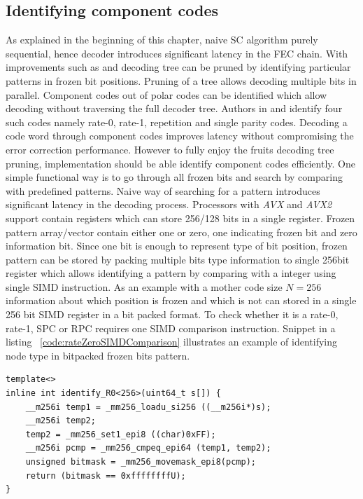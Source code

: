 \subsection{Identifying component codes}
As explained in the beginning of this chapter, naive SC algorithm purely sequential, hence decoder introduces significant latency in the FEC chain. With improvements such as \cite{fastSSC} and \cite{SSC} decoding tree can be pruned by identifying particular patterns in frozen bit positions. Pruning of a tree allows decoding multiple bits in parallel. Component codes out of polar codes can be identified which allow decoding without traversing the full decoder tree. Authors in \cite{SSC} and \cite{fastSSC} identify four such codes namely rate-0, rate-1, repetition and single parity codes. Decoding a code word through component codes improves latency without compromising the error correction performance. However to fully enjoy the fruits decoding tree pruning, implementation should be able identify component codes efficiently. One simple functional way is to go through all frozen bits and search by comparing with predefined patterns. Naive way of searching for a pattern introduces significant latency in the decoding process. Processors with \textit{AVX} and \textit{AVX2} support contain registers which can store 256/128 bits in a single register. Frozen pattern array/vector contain either one or zero, one indicating frozen bit and zero information bit. Since one bit is enough to represent type of bit position, frozen pattern can be stored by packing multiple bits type information to single 256bit register which allows identifying a pattern by comparing with a integer using single SIMD instruction. As an example with a mother code size $N=256$ information about which position is frozen and which is not can stored in a single 256 bit SIMD register in a bit packed format. To check whether it is a rate-0, rate-1, SPC or RPC requires one SIMD comparison instruction. Snippet in a listing ~\ref{code:rateZeroSIMDComparison} illustrates an example of identifying node type in bitpacked frozen bits pattern.
\begin{code}
	\label{code:rateZeroSIMDComparison}
	\begin{verbatim}
template<>
inline int identify_R0<256>(uint64_t s[]) {
	__m256i temp1 = _mm256_loadu_si256 ((__m256i*)s);
	__m256i temp2;
	temp2 = _mm256_set1_epi8 ((char)0xFF);
	__m256i pcmp = _mm256_cmpeq_epi64 (temp1, temp2);
	unsigned bitmask = _mm256_movemask_epi8(pcmp);
	return (bitmask == 0xffffffffU);
}
\end{verbatim}
\end{code}

